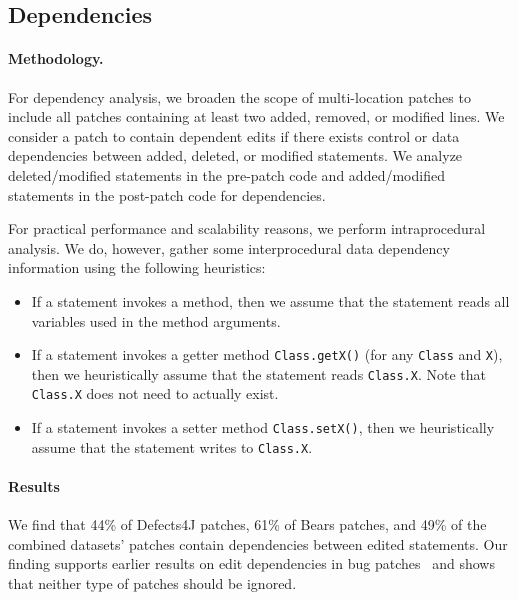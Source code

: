 \documentclass[sigconf, timestamp-false, anonymous=true]{acmart}
\begin{document}
\subsection{Dependencies}


\paragraph{Methodology.} 
For dependency analysis, we broaden the scope of multi-location patches to 
include all patches containing at least two added, removed, or modified lines.
We consider a patch to contain dependent edits if there exists 
control or data dependencies between added, deleted, or modified statements.
We analyze deleted/modified statements in the pre-patch code 
and added/modified statements in the post-patch code for dependencies.
  
For practical performance and scalability reasons, 
we perform intraprocedural analysis. 
We do, however, gather some interprocedural data dependency information 
using the following heuristics:
\begin{itemize}
	\item If a statement invokes a method, then we assume that
	the statement reads all variables used in the method arguments.
	\item If a statement invokes a getter method \texttt{Class.getX()} 
	(for any \texttt{Class} and \texttt{X}), then we heuristically 
	assume that the statement reads \texttt{Class.X}. 
	Note that \texttt{Class.X} does not need to actually exist.
	\item If a statement invokes a setter method \texttt{Class.setX()}, 
	then we heuristically assume that the statement writes to \texttt{Class.X}. 
\end{itemize}

\paragraph{Results}

We find that 44\% of Defects4J patches, 61\% of Bears patches, 
and 49\% of the combined datasets' patches contain dependencies 
between edited statements.
Our finding supports earlier results on edit dependencies in 
bug patches~\cite{zhong2015} and shows that neither type of 
patches should be ignored.
\end{document}

